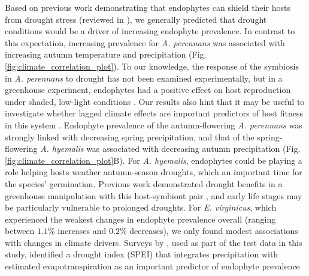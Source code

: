 \documentclass[11pt]{article}
\let\cite\citep
\newcommand{\revise}[1]{{\color{black}{#1}}}
\begin{document}
Based on previous work demonstrating that endophytes can shield their hosts from drought stress (reviewed in \citet{decunta2021systematic}), we generally predicted that drought conditions would be a driver of increasing endophyte prevalence. 
In contrast to this expectation, increasing prevalence for \emph{A. perennans} was associated with \revise{both} increasing autumn temperature and precipitation (Fig. \ref{fig:climate_correlation_plot}). 
To our knowledge, the response of the symbiosis in \emph{A. perennans} to drought has not been examined experimentally, but in a greenhouse experiment, endophytes had a positive effect on host reproduction under shaded, low-light conditions \citep{davitt2010costs}. 
Our results also hint that it may be useful to investigate whether lagged climate effects are important predictors of host fitness in this system \cite{evers2021lagged}.
Endophyte prevalence of the autumn-flowering \emph{A. perennans} was strongly linked with decreasing spring precipitation, and that of the spring-flowering \emph{A. hyemalis} was associated with decreasing autumn precipitation (Fig. \ref{fig:climate_correlation_plot}B). 
For \emph{A. hyemalis}, endophytes could be playing a role helping hosts weather autumn-season droughts, which \revise{is likely also} an important time for the species' germination.
Previous work demonstrated drought benefits in a greenhouse manipulation with this host-symbiont pair \citep{davitt2011understanding}, and early life stages may be particularly vulnerable to prolonged droughts.
For \emph{E. virginicus}, which experienced the weakest changes in endophyte prevalence overall (ranging between $1.1$\% increases and $0.2$\% decreases), we only found modest associations with changes in climate drivers. 
Surveys by \citet{sneck2017variation}, used as part of the test data in this study, identified a drought index (SPEI) that integrates precipitation with estimated evapotranspiration as an important predictor of \revise{contemporary} endophyte prevalence \linelabel{R2C14-begin}\revise{in this species.
The diverse relationships we detect between trends in endophyte prevalence and climate drivers suggest a more complicated picture than the simple explanation that drought alone, as measured through changes in annual precipitation, causes increasing endophyte prevalence through context-dependent fitness benefits.}
\end{document}
